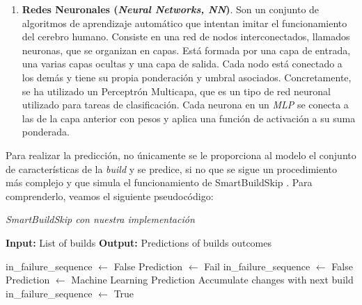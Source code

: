 \begin{enumerate}
    \item \textbf{Redes Neuronales (\textit{Neural Networks, NN})}. Son un conjunto de algoritmos
    de aprendizaje automático que intentan imitar el funcionamiento del cerebro humano. Consiste en
    una red de nodos interconectados, llamados neuronas, que se organizan en capas. Está formada
    por una capa de entrada, una  varias capas ocultas y una capa de salida. Cada nodo está
    conectado a los demás y tiene su propia ponderación y umbral asociados. Concretamente, se ha
    utilizado un Perceptrón Multicapa, que es un tipo de red neuronal utilizado para tareas de
    clasificación. Cada neurona en un \textit{MLP} se conecta a las de la capa anterior con pesos
    y aplica una función de activación a su suma ponderada.
\end{enumerate}

Para realizar la predicción, no únicamente se le proporciona al modelo el conjunto de
características de la \textit{build} y se predice, si no que se sigue un procedimiento más
complejo y que simula el funcionamiento de SmartBuildSkip \cite{2}. Para comprenderlo, veamos
el siguiente pseudocódigo:

\begin{algorithm}[H]
    \caption{\textit{SmartBuildSkip con nuestra implementación}}
    \begin{algorithmic}[1]
    \State \textbf{Input:} List of builds
    \State \textbf{Output:} Predictions of builds outcomes
    
    \State in\_failure\_sequence $\gets$ False 
            \State Prediction $\gets$ Fail  
                           
                \State in\_failure\_sequence $\gets$ False 
            \EndIf
            \Else
            \State Prediction $\gets$ Machine Learning Prediction 
                \State Accumulate changes with next build       
            \Else
                                                
                    \State in\_failure\_sequence $\gets$ True   
                \EndIf
            \EndIf
        \EndIf
    \EndFor
    \end{algorithmic}
\end{algorithm}

